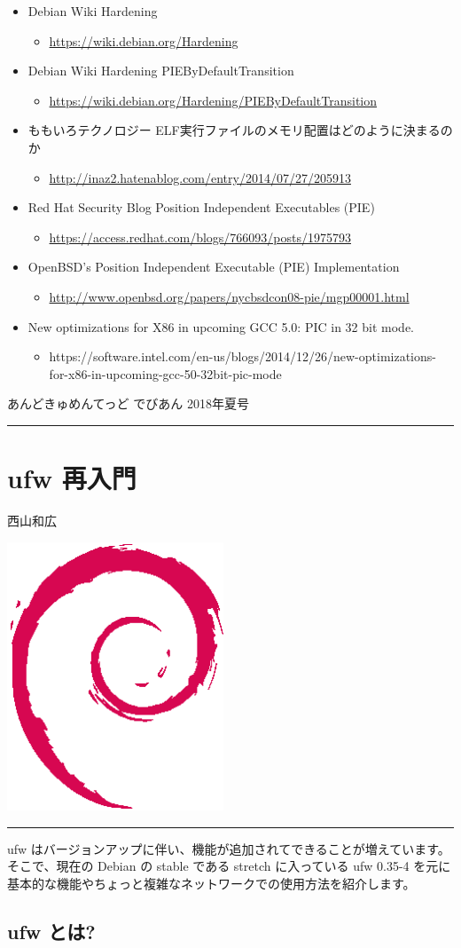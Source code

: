 \documentclass[mingoth,a4paper]{jsarticle}
\renewcommand{\dancersection}[2]{%
\newpage
あんどきゅめんてっど でびあん 2018年夏号
%
\vspace{0.1mm}\\
{\color{dancerdarkblue}\rule{\hsize}{2mm}}

%
%
\begin{minipage}[t]{0.6\hsize}
\color{dancerdarkblue}
\vspace{1cm}
\section{#1}
\hfill{}#2\\
\end{minipage}
\begin{minipage}[t]{0.4\hsize}
\vspace{-2cm}
\hfill{}\includegraphics[height=8cm]{image200502/openlogo-nd.eps}\\
\vspace{-5cm}
\end{minipage}
%
{\color{dancerlightblue}\rule{0.66\hsize}{2mm}}
%
\vspace{2cm}
}
\begin{document}
\begin{itemize}
\item Debian Wiki Hardening
  \begin{itemize}
  \item \url{https://wiki.debian.org/Hardening}
  \end{itemize}
\item Debian Wiki Hardening PIEByDefaultTransition
  \begin{itemize}
  \item \url{https://wiki.debian.org/Hardening/PIEByDefaultTransition}
  \end{itemize}
\item ももいろテクノロジー ELF実行ファイルのメモリ配置はどのように決まるのか
  \begin{itemize}
  \item \url{http://inaz2.hatenablog.com/entry/2014/07/27/205913}
  \end{itemize}
\item Red Hat Security Blog Position Independent Executables (PIE)
  \begin{itemize}
  \item \url{https://access.redhat.com/blogs/766093/posts/1975793}
  \end{itemize}
\item OpenBSD's Position Independent Executable (PIE) Implementation
  \begin{itemize}
  \item \url{http://www.openbsd.org/papers/nycbsdcon08-pie/mgp00001.html}
  \end{itemize}
\item New optimizations for X86 in upcoming GCC 5.0: PIC in 32 bit mode.
  \begin{itemize}
  \item https://software.intel.com/en-us/blogs/2014/12/26/new-optimizations-for-x86-in-upcoming-gcc-50-32bit-pic-mode
  \end{itemize}
\end{itemize}

\dancersection{ufw 再入門}{西山和広}

ufw はバージョンアップに伴い、機能が追加されてできることが増えています。
そこで、現在の Debian の stable である stretch に入っている ufw 0.35-4 を元に基本的な機能やちょっと複雑なネットワークでの使用方法を紹介します。

\subsection{ufw とは?}
\end{document}
